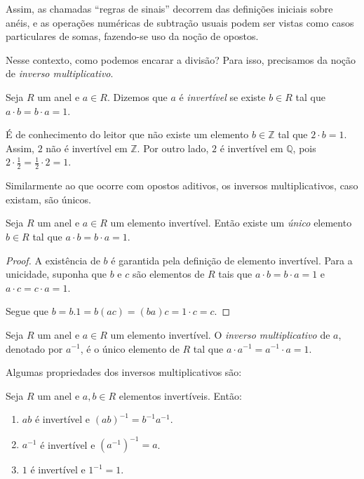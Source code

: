 Assim, as chamadas ``regras de sinais'' decorrem das definições iniciais sobre anéis, e as operações numéricas de subtração usuais podem ser vistas como casos particulares de somas, fazendo-se uso da noção de opostos.

Nesse contexto, como podemos encarar a divisão?
Para isso, precisamos da noção de \emph{inverso multiplicativo}.

\begin{definition}
    Seja $R$ um anel e $a \in R$.
    Dizemos que $a$ é \emph{invertível} se existe $b \in R$ tal que $a\cdot b=b\cdot a=1$.
\end{definition}

É de conhecimento do leitor que não existe um elemento $b \in \mathbb{Z}$ tal que $2\cdot b=1$.
Assim, $2$ não é invertível em $\mathbb{Z}$.
Por outro lado, $2$ é invertível em $\mathbb{Q}$, pois $2\cdot \frac{1}{2}=\frac{1}{2}\cdot 2=1$.

Similarmente ao que ocorre com opostos aditivos, os inversos multiplicativos, caso existam, são únicos.

\begin{proposition}
    Seja $R$ um anel e $a \in R$ um elemento invertível.
    Então existe um \emph{único} elemento $b \in R$ tal que $a\cdot b=b\cdot a=1$.
\end{proposition}
\begin{proof}
    A existência de $b$ é garantida pela definição de elemento invertível.
    Para a unicidade, suponha que $b$ e $c$ são elementos de $R$ tais que $a\cdot b=b\cdot a=1$ e $a\cdot c=c\cdot a=1$.

    Segue que $b=b.1=b(ac)=(ba)c=1\cdot c=c$.
\end{proof}

\begin{definition}
    Seja $R$ um anel e $a \in R$ um elemento invertível.
    O \emph{inverso multiplicativo} de $a$, denotado por $a^{-1}$, é o único elemento de $R$ tal que $a\cdot a^{-1}=a^{-1}\cdot a=1$.
\end{definition}

Algumas propriedades dos inversos multiplicativos são:

\begin{proposition}
    Seja $R$ um anel e $a, b \in R$ elementos invertíveis. Então:
    \begin{enumerate}[label=(\roman*)]
        \item $ab$ é invertível e $(ab)^{-1}=b^{-1}a^{-1}$.
        \item $a^{-1}$ é invertível e $(a^{-1})^{-1}=a$.
        \item $1$ é invertível e $1^{-1}=1$.
    \end{enumerate}
\end{proposition}

